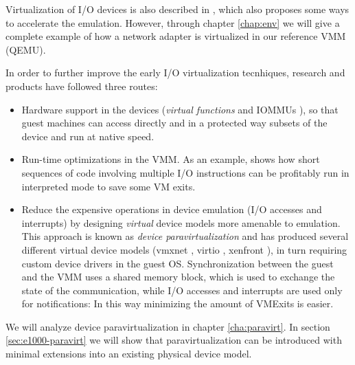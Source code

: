 Virtualization of I/O devices is also described in \cite{ref:vmware2001}, which also proposes some ways to accelerate the emulation.
However, through chapter \ref{chap:env} we will give a complete example of how a network adapter is virtualized in our reference
VMM (QEMU).

\vspace{0.5cm}

In order to further improve the early I/O virtualization tecnhiques, research and products have followed three routes:
\begin{itemize}
  \item Hardware support in the devices (\emph{virtual functions} and IOMMUs \cite{ref:iommu}), so that guest machines can access directly
	and in a protected way subsets of the device and run at native speed.

  \item Run-time optimizations in the VMM. As an example, \cite{ref:usenix-avvx} shows how short sequences of code involving multiple I/O
	instructions can be profitably run in interpreted mode to save some VM exits.

  \item Reduce the expensive operations in device emulation (I/O accesses and interrupts) by designing \emph{virtual} device models more 
amenable to emulation. This approach is known as \emph{device paravirtualization} and has produced several different virtual device models 
(vmxnet \cite{ref:vmxnet3}, virtio \cite{ref:virtio}, xenfront 
\cite{ref:xenbook}), in turn requiring custom device drivers in the guest OS.
Synchronization between the guest and the VMM uses a shared memory block, which is used to exchange the state of the communication, while
I/O accesses and interrupts are used only for notifications: In this way minimizing the amount of VMExits is easier.

\end{itemize}

We will analyze device paravirtualization in chapter \ref{cha:paravirt}.
In section \ref{sec:e1000-paravirt} we will show that paravirtualization can be introduced with minimal extensions into an existing physical 
device model.
